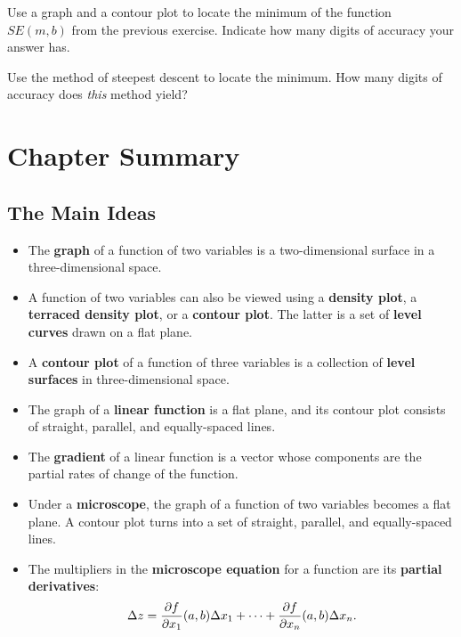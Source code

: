 {{{{\numa  Use a graph and a contour plot to locate the minimum of the function $SE(m, b)$ from the previous exercise.  Indicate how many digits of accuracy your answer has.

\sub  Use the method of steepest descent to locate the minimum.  How many digits of accuracy does {\em this\/} method yield?
 

\section{Chapter Summary}

\subsection{The Main Ideas}

\begin{itemize}

\item  The {\bf graph} of a function of two variables is a two-dimensional surface in a three-dimensional space.  

\item  A function of two variables can also be viewed using a {\bf density plot}, a {\bf terraced density plot}, or a {\bf contour plot}.   The latter is a set of {\bf level curves} drawn on a flat plane.

\item  A {\bf contour plot} of a function of three variables is a collection of {\bf level surfaces} in three-dimensional space.

\item  The graph of a {\bf linear function} is a flat plane, and its contour plot consists of straight, parallel, and equally-spaced lines.

\item  The {\bf gradient} of a linear function is a vector whose components are the partial rates of change of the function.  

\item  Under a {\bf microscope}, the graph of a function of two variables becomes a flat plane.  A contour plot turns into a set of straight, parallel, and equally-spaced lines.

\item  The multipliers in the {\bf microscope equation} for a function are its {\bf partial derivatives}:
        \[
\Delta z = {\partial f \over \partial x_1}(a, b)\Delta x_1 + \cdots +
                {\partial f \over \partial x_n}(a, b)\Delta x_n.
\]


\end{itemize}}}}}
